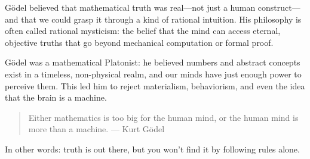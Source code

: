 \begin{tcolorbox}[title=Historical Sidebar: \textit{Will Work for Beer}, colback=gray!5, colframe=black, fonttitle=\bfseries]

  Gödel believed that mathematical truth was real—not just a human construct—and that we could grasp it through a kind of rational intuition. His philosophy is often called rational mysticism: the belief that the mind can access eternal, objective truths that go beyond mechanical computation or formal proof.

  \medskip

  Gödel was a mathematical Platonist: he believed numbers and abstract concepts exist in a timeless, non-physical realm, and our minds have just enough power to perceive them. This led him to reject materialism, behaviorism, and even the idea that the brain is a machine.
  
  \begin{quote}
    Either mathematics is too big for the human mind, or the human mind is more than a machine.  ---  Kurt Gödel
  \end{quote}
  
  In other words: truth is out there, but you won’t find it by following rules alone.
  
\end{tcolorbox}

